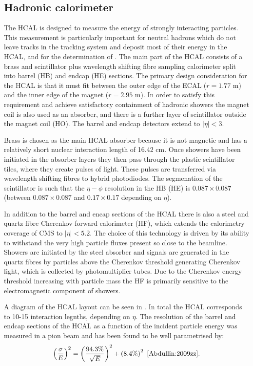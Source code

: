 

\subsection{Hadronic calorimeter}
\label{sec:HCAL}
The \ac{HCAL} is designed to measure the energy of strongly interacting particles. This measurement is particularly important for neutral hadrons which do not leave tracks in the tracking system and deposit most of their energy in the \ac{HCAL}, and for the determination of \MET.  The main part of the \ac{HCAL} consists of a brass and scintillator plus wavelength shifting fibre sampling calorimeter split into barrel (\ac{HB}) and endcap (\ac{HE}) sections. The primary design consideration for the \ac{HCAL} is that it must fit between the outer edge of the \ac{ECAL} ($r=1.77$ m) and the inner edge of the magnet ($r=2.95$ m). In order to satisfy this requirement and achieve satisfactory containment of hadronic showers the magnet coil is also used as an absorber, and there is a further layer of scintillator outside the magnet coil (\ac{HO}). The barrel and endcap detectors extend to $|\eta|<3$.

Brass is chosen as the main \ac{HCAL} absorber because it is not magnetic and has a relatively short nuclear interaction length of 16.42 cm. Once showers have been initiated in the absorber layers they then pass through the plastic scintillator tiles, where they create pulses of light. These pulses are transferred via wavelength shifting fibres to hybrid photodiodes. The segmenation of the scintillator is such that the $\eta-\phi$ resolution in the \ac{HB} (\ac{HE}) is $0.087\times 0.087$ (between $0.087\times 0.087$ and $0.17\times 0.17$ depending on $\eta$).

In addition to the barrel and encap sections of the \ac{HCAL} there is also a steel and quartz fibre Cherenkov forward calorimeter (\ac{HF}), which extends the calorimetry coverage of CMS to $|\eta|<5.2$. The choice of this technology is driven by its ability to withstand the very high particle fluxes present so close to the beamline. Showers are initiated by the steel absorber and signals are generated in the quartz fibres by particles above the Cherenkov threshold generating Cherenkov light, which is collected by photomultiplier tubes. Due to the Cherenkov energy threshold increasing with particle mass the \ac{HF} is primarily sensitive to the electromagnetic component of showers.

A diagram of the \ac{HCAL} layout can be seen in . In total the \ac{HCAL} corresponds to 10-15 interaction legnths, depending on $\eta$. The resolution of the barrel and endcap sections of the \ac{HCAL} as a function of the incident particle energy was measured in a pion beam and has been found to be well parametrised by:
\begin{equation} 
  \label{eq:hcalres}
  \left(\frac{\sigma}{E}\right)^{2}=\left(\frac{94.3\%}{\sqrt{E}}\right)^{2}+\left(8.4\%\right)^{2}~\cite{Abdullin:2009zz}.
\end{equation}


